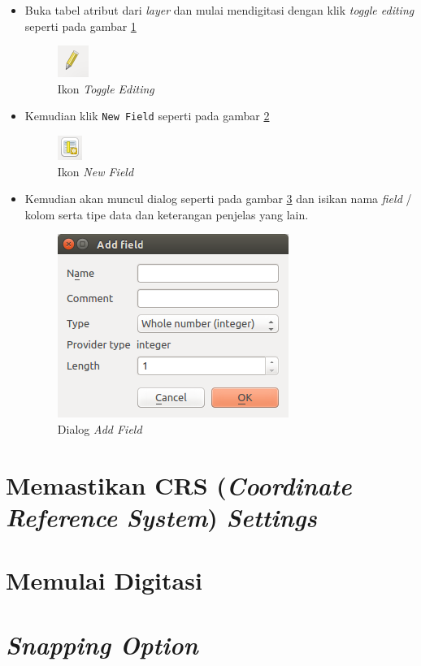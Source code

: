 \begin{itemize}

  \item Buka tabel atribut dari \textit{layer} dan mulai mendigitasi dengan klik \textit{toggle editing} seperti pada gambar \ref{fig:iconediting}
  
  \begin{figure}[H]
    \centering
    \includegraphics[scale=1]{./resources/042-icon-toggle-editing}
    \caption{Ikon \textit{Toggle Editing}}
    \label{fig:iconediting}
  \end{figure}  
  
  \item Kemudian klik \texttt{New Field} seperti pada gambar \ref{fig:iconnewfield}
  
  \begin{figure}[H]
    \centering
    \includegraphics[scale=1]{./resources/043-icon-new-field}
    \caption{Ikon \textit{New Field}}
    \label{fig:iconnewfield}
  \end{figure}
  
  \item Kemudian akan muncul dialog seperti pada gambar \ref{fig:addfielddialog} dan isikan nama \textit{field} / kolom serta tipe data dan keterangan penjelas yang lain.
  
  \begin{figure}[H]
    \centering
    \includegraphics[scale=1]{./resources/044-add-field-dialog}
    \caption{Dialog \textit{Add Field}}
    \label{fig:addfielddialog}
  \end{figure}

\end{itemize}

\section{Memastikan CRS (\textit{Coordinate Reference System}) \textit{Settings}}

\section{Memulai Digitasi}

\section{\textit{Snapping Option}}